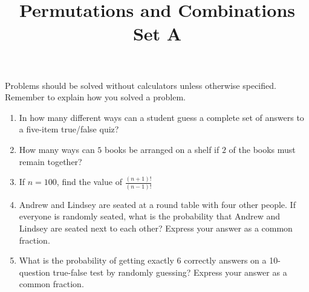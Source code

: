 \documentclass{article}
\title{Permutations and Combinations Set A}
\author{}
\date{}
\begin{document}
    \maketitle
    \noindent Problems should be solved without calculators unless otherwise specified.
    Remember to explain how you solved a problem.
    \begin{enumerate}
        \item In how many different ways can a student guess a complete set of answers to a
        five-item true/false quiz?
        \vspace{3cm}
        \item How many ways can $5$ books be arranged on a shelf if $2$ of the books must
        remain together?
        \vspace{3cm}
        \item If $n = 100$, find the value of $\frac{(n+1)!}{(n-1)!}$
        \pagebreak
        \item Andrew and Lindsey are seated at a round table with four other people. If everyone
        is randomly seated, what is the probability that Andrew and Lindsey are seated next to
        each other? Express your answer as a common fraction.
        \vspace{3cm}
        \item What is the probability of getting exactly $6$ correctly answers on a 10-question
        true-false test by randomly guessing? Express your answer as a common fraction.
        \vspace{3cm}
    \end{enumerate}
\end{document}
